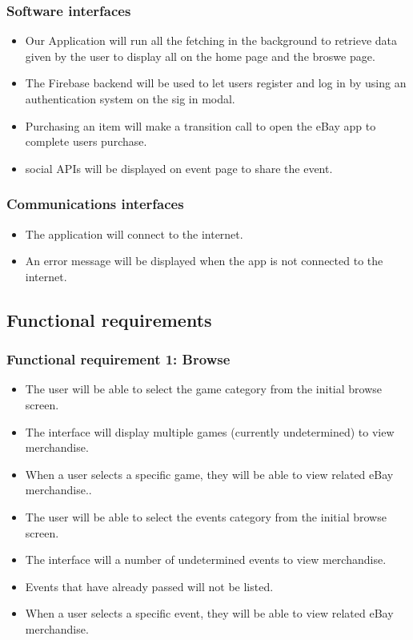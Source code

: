 \documentclass[onecolumn, draftclsnofoot,10pt, compsoc]{IEEEtran}
\begin{document}
\subsubsection{Software interfaces}
\begin{itemize}
\item Our Application will run all the fetching in the background to retrieve data given by the user to display all on the home page and the broswe page.
\item The Firebase backend will be used to let users register and log in by using an authentication system on the sig in modal. 
\item Purchasing an item will make a transition call to open the eBay app to complete users purchase.
\item social APIs will be displayed on event page to share the event.
\end{itemize}

\subsubsection{Communications interfaces}
\begin{itemize}
\item The application will connect to the internet.
\item An error message will be displayed when the app is not connected to the internet.
\end{itemize}
\subsection{Functional requirements}

\subsubsection{Functional requirement 1: Browse}
\begin{itemize}
\item The user will be able to select the game category from the initial browse screen.
\item The interface will display multiple games (currently undetermined) to view merchandise.
\item When a user selects a specific game, they will be able to view related eBay merchandise..
\item The user will be able to select the events category from the initial browse screen.
\item The interface will a number of undetermined events to view merchandise.
\item Events that have already passed will not be listed.
\item When a user selects a specific event, they will be able to view related eBay merchandise.
\end{itemize}
\end{document}
